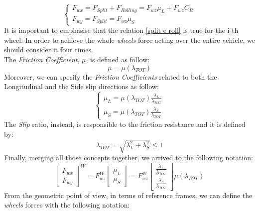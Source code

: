 \documentclass[a4paper,12pt,titlepage]{report}
\numberwithin{figure}{section}
\begin{document}
		\begin{equation} \label{split e roll}
			\begin{cases}
				F_{wx} = F_{Split} + F_{Rolling} = F_{wz} \mu_{L} + F_{wz} C_{R} \\
				F_{wy} = F_{Split} = F_{wz} \mu_{S}
			\end{cases}
		\end{equation}
	It is important to emphasise that the relation \ref{split e roll} is true for the i-th wheel. In order to achieve the whole \textit{wheels} force acting over the entire vehicle, we should consider it four times. \\ The \textit{Friction Coefficient}, $ \mu $, is defined as follow:
		\begin{equation}
			\mu = \mu(\lambda_{TOT})
		\end{equation}
	Moreover, we can specify the \textit{Friction Coefficients} related to both the Longitudinal and the Side slip directions as follow:
		\begin{equation}
			\begin{cases}
				\mu_{L} = \mu(\lambda_{TOT}) \frac{\lambda_{L}}{\lambda_{TOT}}\\
				\mu_{S} = \mu(\lambda_{TOT}) \frac{\lambda_{S}}{\lambda_{TOT}}
			\end{cases}
		\end{equation}
	The \textit{Slip} ratio, instead, is responsible to the friction resistance and it is defined by:
		\begin{equation}
			\lambda_{TOT} = \sqrt{\lambda_{L}^{2} + \lambda_{S}^{2}} \leq 1
		\end{equation}
	Finally, merging all those concepts together, we arrived to the following notation:	
		\begin{equation} \label{Force 1st part}
			\begin{bmatrix}
				F_{wx} \\
				F_{wy}
			\end{bmatrix}^{W} = 
		F_{wz}^{W}
			\begin{bmatrix}
				\mu_{L} \\
				\mu_{S}
			\end{bmatrix} = 
		F_{wz}^{W}
			\begin{bmatrix}
				\frac{\lambda_{L}}{\lambda_{TOT}} \\
				\frac{\lambda_{S}}{\lambda_{TOT}}
			\end{bmatrix}
		\mu(\lambda_{TOT})	
		\end{equation}
	From the geometric point of view, in terms of reference frames, we can define the \textit{wheels} forces with the following notation:
\end{document}
